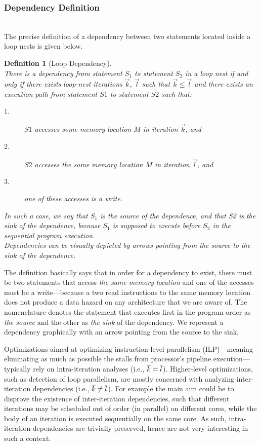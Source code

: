 \documentclass[acmsmall,review]{acmart}\settopmatter{printfolios=true,printccs=false,printacmref=false}
\newtheorem{mydef}{Definition}
\begin{document}
\newpage
\subsubsection{Dependency Definition}
$\mbox{ }$\\

The precise definition of a dependency between two statements
located inside a loop nests is given below.

\begin{mydef}[Loop Dependency]\label{Loop-Dep}
$\mbox{ }$\\
There is a dependency from statement $S_1$ to statement $S_2$
in a loop nest {\em if and only if} there exists loop-nest
iterations $\vec{k}$, $\vec{l}$ such that $\vec{k} \leq \vec{l}$ 
and there exists an execution path from statement $S1$ to 
statement $S2$ \emph{such that:}
\begin{description}
    \item[1.] $S1$ accesses some memory location $M$ in iteration $\vec{k}$, and
    \item[2.] $S2$ accesses the same memory location $M$ in iteration $\vec{l}$, and
    \item[3.] one of these accesses is a write.
\end{description}
In such a case, we say that $S_1$ is the \emph{source} of the dependence,
and that S2 is the \emph{sink} of the dependence, because $S_1$ is supposed
to execute before $S_2$ in the sequential program execution.\\
Dependencies can be visually depicted by arrows pointing from the source
to the sink of the dependence.
\end{mydef}

The definition basically says that in order for a dependency to exist,
there must be two statements that access \emph{the same memory location} 
and one of the accesses must be a write---because a two read instructions
to the same memory location does not produce a data hazard on any 
architecture that we are aware of. The nomenclature denotes the statement 
that executes first in the program order as \emph{the source} and the 
other as \emph{the sink} of the dependency. We represent a dependency 
graphically with an arrow pointing from the source to the sink. 

Optimizations aimed at optimizing instruction-level parallelism 
(ILP)---meaning eliminating as much as possible the stalls from
processor's pipeline execution---typically rely on intra-iteration
analyses (i.e., $\overline{k}=\overline{l}$).   Higher-level optimizations,
such as detection of loop parallelism, are mostly concerned with
analyzing inter-iteration dependencies (i.e., $\overline{k}\neq\overline{l}$).
For example the main aim could be to disprove the existence of inter-iteration
dependencies, such that different iterations may be scheduled 
out of order (in parallel) on different cores, while the body of an 
iteration is executed sequentially on the same core. As such, 
intra-iteration dependencies are trivially preserved, hence are
not very interesting in such a context.
\end{document}
